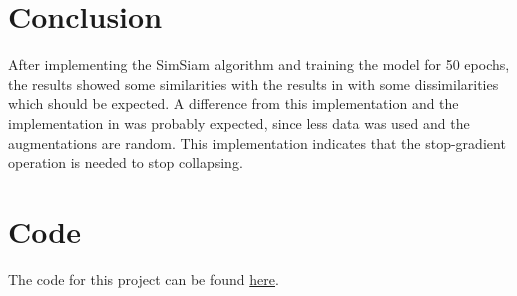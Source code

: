 \documentclass[12pt]{article}
\begin{document}
\section*{Conclusion}
After implementing the SimSiam algorithm and training the model for 50 epochs, the results showed some similarities with the results in
\cite{chen2021exploring} with some dissimilarities which should be expected. A difference from this implementation and the implementation in 
\cite{chen2021exploring} was probably expected, since less data was used and the augmentations are random. This implementation 
indicates that the stop-gradient operation is needed to stop collapsing.



\appendix
\section{Code}
The code for this project can be found \href{https://github.com/mathiasmellemstuen/SimSiam}{here}.
\end{document}
